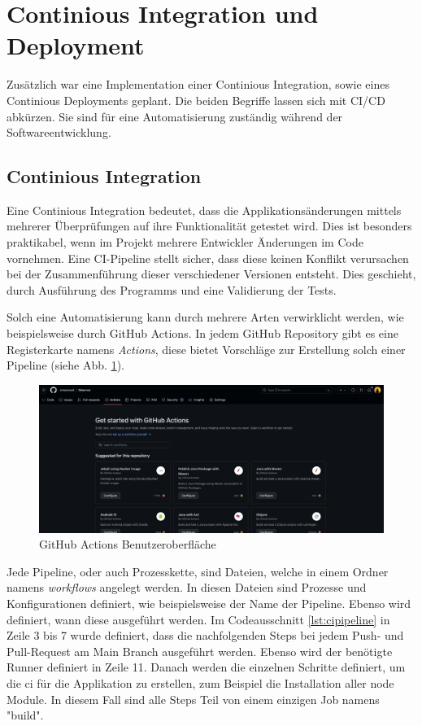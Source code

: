 \section{Continious Integration und Deployment}

Zusätzlich war eine Implementation einer Continious Integration, sowie eines Continious Deployments geplant. 
Die beiden Begriffe lassen sich mit CI/CD abkürzen.
Sie sind für eine Automatisierung zuständig während der Softwareentwicklung. 

\subsection{Continious Integration}

Eine Continious Integration bedeutet, dass die Applikationsänderungen mittels mehrerer Überprüfungen auf ihre Funktionalität getestet wird.
Dies ist besonders praktikabel, wenn im Projekt mehrere Entwickler Änderungen im Code vornehmen. 
Eine CI-Pipeline stellt sicher, dass diese keinen Konflikt verursachen bei der Zusammenführung dieser verschiedener Versionen entsteht. 
Dies geschieht, durch Ausführung des Programms und eine Validierung der Tests. 
\cite{cicdabout}

Solch eine Automatisierung kann durch mehrere Arten verwirklicht werden, wie beispielsweise durch GitHub Actions. 
In jedem GitHub Repository gibt es eine Registerkarte namens \emph{Actions}, diese bietet Vorschläge zur Erstellung solch einer Pipeline (siehe Abb. \ref{fig:implementation:ghactions}). 

\begin{figure}
    \centering
    \includegraphics[scale=0.25]{pics/githubactions.png}
    \caption{GitHub Actions Benutzeroberfläche}
    \label{fig:implementation:ghactions}
\end{figure}

Jede Pipeline, oder auch Prozesskette, sind Dateien, welche in einem Ordner namens \emph{workflows} angelegt werden. 
In diesen Dateien sind Prozesse und Konfigurationen definiert, wie beispielsweise der Name der Pipeline.
Ebenso wird definiert, wann diese ausgeführt werden. 
Im Codeausschnitt \ref{lst:cipipeline} in Zeile 3 bis 7 wurde definiert, dass die nachfolgenden Steps bei jedem Push- und Pull-Request am Main Branch ausgeführt werden. 
Ebenso wird der benötigte Runner definiert in Zeile 11. 
Danach werden die einzelnen Schritte definiert, um die \gls{ci} für die Applikation zu erstellen, zum Beispiel die Installation aller node Module. 
In diesem Fall sind alle Steps Teil von einem einzigen Job namens "build". 

